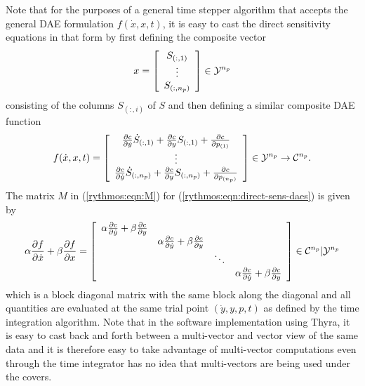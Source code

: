 \documentclass[pdf,ps2pdf,11pt]{SANDreport}
\begin{document}
Note that for the purposes of a general time stepper algorithm that accepts
the general DAE formulation $f(\dot{x},x,t)$, it is easy to cast the direct
sensitivity equations in that form by first defining the composite vector
%
\begin{equation}
x =
{\bmat{c}
S_{(:,1)} \\ \vdots \\ S_{(:,n_p)}
\emat}
\in \mathcal{Y}^{n_p}
\end{equation}
%
consisting of the columns $S_{(:,i)}$ of $S$ and then defining a similar
composite DAE function
%
\begin{equation}
f(\dot{x},x,t) =
{\bmat{c}
%
\frac{\partial c}{\partial \dot{y}} \dot{S}_{(:,1)}
+ \frac{\partial c}{\partial y} S_{(:,1)}
+ \frac{\partial c}{\partial p_{(1)}} \\
%
\vdots \\
%
\frac{\partial c}{\partial \dot{y}} \dot{S}_{(:,n_p)}
+ \frac{\partial c}{\partial y} S_{(:,n_p)}
+ \frac{\partial c}{\partial p_{(n_p)}}
%
\emat}
\in \mathcal{Y}^{n_p} \rightarrow \mathcal{C}^{n_p}.
\label{rythmos:eqn:direct-sens-daes}
\end{equation}
%
The matrix $M$ in (\ref{rythmos:eqn:M}) for
(\ref{rythmos:eqn:direct-sens-daes}) is given by
%
\begin{equation}
\alpha \frac{\partial f}{\partial \dot{x}} + \beta \frac{\partial f}{\partial x} = 
{\bmat{cccc}
\alpha \frac{\partial c}{\partial \dot{y}} + \beta \frac{\partial c}{\partial y} \\
& \alpha \frac{\partial c}{\partial \dot{y}} + \beta \frac{\partial c}{\partial y} \\
& & \ddots \\
& & & \alpha \frac{\partial c}{\partial \dot{y}} + \beta \frac{\partial c}{\partial y}
\emat}
\in \mathcal{C}^{n_p}|\mathcal{Y}^{n_p}
\label{rythmos:eqn:direct-sens-daes-jac}
\end{equation}
%
which is a block diagonal matrix with the same block along the diagonal and
all quantities are evaluated at the same trial point $(\dot{y},y,p,t)$ as
defined by the time integration algorithm.  Note that in the software
implementation using Thyra, it is easy to cast back and forth between a
multi-vector and vector view of the same data and it is therefore easy to take
advantage of multi-vector computations even through the time integrator has no
idea that multi-vectors are being used under the covers.
\end{document}
